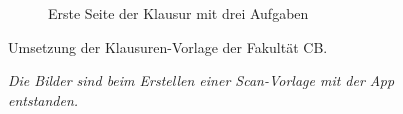 \documentclass[notables, nomenclature, oneside, 150]{HSMW-Thesis}
\begin{document}
\begin{figure}[th]
\begin{subfigure}[t]{0.4\textwidth}
        	\caption{Erste Seite der Klausur mit drei Aufgaben}
        	\label{fig:seite2}
    	\end{subfigure}
    	\caption{Umsetzung der Klausuren-Vorlage der Fakultät CB.}
    	\caption*{\textit{Die Bilder sind beim Erstellen einer Scan-Vorlage mit der App entstanden.}}
    	\label{fig:klausur}
	\end{figure}
	
\end{document}
